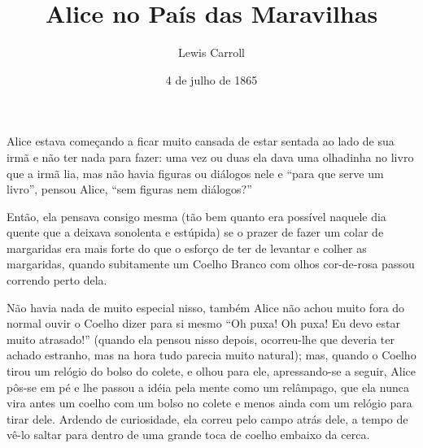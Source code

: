 \documentclass[12pt, a4paper]{article}
\title{Alice no País das Maravilhas}
\author{Lewis Carroll}
\date{4 de julho de 1865}
\begin{document}
  \maketitle

  Alice estava começando a ficar muito cansada de estar sentada ao lado de sua irmã e não ter nada para fazer: uma vez ou duas ela dava uma olhadinha no livro que a irmã lia, mas não havia figuras ou diálogos nele e “para que serve um livro”, pensou Alice, “sem figuras nem diálogos?”

  Então, ela pensava consigo mesma (tão bem quanto era possível naquele dia quente que a deixava sonolenta e estúpida) se o prazer de fazer um colar de margaridas era mais forte do que o esforço de ter de levantar e colher as margaridas, quando subitamente um Coelho Branco com olhos cor-de-rosa passou correndo perto dela.

  Não havia nada de muito especial nisso, também Alice não achou muito fora do normal ouvir o Coelho dizer para si mesmo “Oh puxa! Oh puxa! Eu devo estar muito atrasado!” (quando ela pensou nisso depois, ocorreu-lhe que deveria ter achado estranho, mas na hora tudo parecia muito natural); mas, quando o Coelho tirou um relógio do bolso do colete, e olhou para ele, apressando-se a seguir, Alice pôs-se em pé e lhe passou a idéia pela mente como um relâmpago, que ela nunca vira antes um coelho com um bolso no colete e menos ainda com um relógio para tirar dele. Ardendo de curiosidade, ela correu pelo campo atrás dele, a tempo de vê-lo saltar para dentro de uma grande toca de coelho embaixo da cerca.
\end{document}
